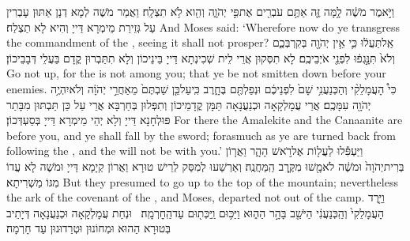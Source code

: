 {וַיֹּ֣אמֶר מֹשֶׁ֔ה לָ֥מָּה זֶּ֛ה אַתֶּ֥ם עֹבְרִ֖ים אֶת\maqqaf פִּ֣י יְהֹוָ֑ה וְהִ֖וא לֹ֥א תִצְלָֽח׃}
{וַאֲמַר מֹשֶׁה לְמָא דְנָן אַתּוּן עָבְרִין עַל גְּזֵירַת מֵימְרָא דַּייָ וְהִיא לָא תַצְלַח׃}
{And Moses said: ‘Wherefore now do ye transgress the commandment of the \lord, seeing it shall not prosper?}{}
{אַֽל\maqqaf תַּעֲל֔וּ כִּ֛י אֵ֥ין יְהֹוָ֖ה בְּקִרְבְּכֶ֑ם וְלֹא֙ תִּנָּ֣גְפ֔וּ לִפְנֵ֖י אֹיְבֵיכֶֽם׃}
{לָא תִסְּקוּן אֲרֵי לֵית שְׁכִינְתָא דַּייָ בֵּינֵיכוֹן וְלָא תִתַּבְרוּן קֳדָם בַּעֲלֵי דְּבָבֵיכוֹן׃}
{Go not up, for the \lord\space is not among you; that ye be not smitten down before your enemies.}{}
{כִּי֩ הָעֲמָלֵקִ֨י וְהַכְּנַעֲנִ֥י שָׁם֙ לִפְנֵיכֶ֔ם וּנְפַלְתֶּ֖ם בֶּחָ֑רֶב כִּֽי\maqqaf עַל\maqqaf כֵּ֤ן שַׁבְתֶּם֙ מֵאַחֲרֵ֣י יְהֹוָ֔ה וְלֹא\maqqaf יִהְיֶ֥ה יְהֹוָ֖ה עִמָּכֶֽם׃}
{אֲרֵי עֲמָלְקָאָה וּכְנַעֲנָאָה תַּמָּן קֳדָמֵיכוֹן וְתִפְּלוּן בְּחַרְבָּא אֲרֵי עַל כֵּן תַּבְתּוּן מִבָּתַר פּוּלְחָנָא דַּייָ וְלָא יְהֵי מֵימְרָא דַּייָ בְּסַעְדְּכוֹן׃}
{For there the Amalekite and the Canaanite are before you, and ye shall fall by the sword; forasmuch as ye are turned back from following the \lord, and the \lord\space will not be with you.’}{}
{וַיַּעְפִּ֕לוּ לַעֲל֖וֹת אֶל\maqqaf רֹ֣אשׁ הָהָ֑ר וַאֲר֤וֹן בְּרִית\maqqaf יְהֹוָה֙ וּמֹשֶׁ֔ה לֹא\maqqaf מָ֖שׁוּ מִקֶּ֥רֶב הַֽמַּחֲנֶֽה׃}
{וְאַרְשַׁעוּ לְמִסַּק לְרֵישׁ טוּרָא וַאֲרוֹן קְיָמָא דַּייָ וּמֹשֶׁה לָא עֲדוֹ מִגּוֹ מַשְׁרִיתָא׃}
{But they presumed to go up to the top of the mountain; nevertheless the ark of the covenant of the \lord, and Moses, departed not out of the camp.}{}
{וַיֵּ֤רֶד הָעֲמָלֵקִי֙ וְהַֽכְּנַעֲנִ֔י הַיֹּשֵׁ֖ב בָּהָ֣ר הַה֑וּא וַיַּכּ֥וּם וַֽיַּכְּת֖וּם עַד\maqqaf הַֽחׇרְמָֽה׃ \petucha }
{וּנְחַת עֲמָלְקָאָה וּכְנַעֲנָאָה דְּיָתֵיב בְּטוּרָא הַהוּא וּמְחוֹנוּן וּטְרַדוּנוּן עַד חָרְמָה׃}

